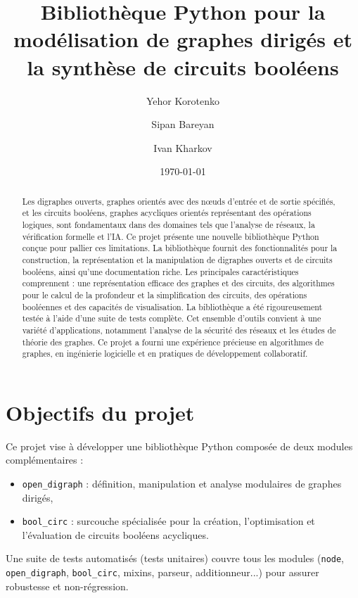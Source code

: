 \documentclass[a4paper,12pt]{article}
\title{Bibliothèque Python pour la modélisation de graphes dirigés et la synthèse de circuits booléens}
\author{Yehor Korotenko \and Sipan Bareyan \and Ivan Kharkov}
\date{\today}
\begin{document}
\maketitle
\begin{abstract}
    Les digraphes ouverts, graphes orientés avec des nœuds d'entrée et de
    sortie spécifiés, et les circuits booléens, graphes acycliques orientés
    représentant des opérations logiques, sont fondamentaux dans des domaines
    tels que l'analyse de réseaux, la vérification formelle et l'IA. Ce projet
    présente une nouvelle bibliothèque Python conçue pour pallier ces
    limitations. La bibliothèque fournit des fonctionnalités pour la
    construction, la représentation et la manipulation de digraphes ouverts et
    de circuits booléens, ainsi qu'une documentation riche. Les principales
    caractéristiques comprennent : une représentation efficace des graphes et
    des circuits, des algorithmes pour le calcul de la profondeur et la
    simplification des circuits, des opérations booléennes et des capacités de
    visualisation. La bibliothèque a été rigoureusement testée à l'aide d'une
    suite de tests complète. Cet ensemble d'outils convient à une variété
    d'applications, notamment l'analyse de la sécurité des réseaux et les
    études de théorie des graphes. Ce projet a fourni une expérience précieuse
    en algorithmes de graphes, en ingénierie logicielle et en pratiques de
    développement collaboratif.
\end{abstract}

\section{Objectifs du projet}
Ce projet vise à développer une bibliothèque Python composée de deux modules complémentaires :
\begin{itemize}
  \item \texttt{open\_digraph} : définition, manipulation et analyse modulaires de graphes dirigés,
  \item \texttt{bool\_circ} : surcouche spécialisée pour la création, l'optimisation et l'évaluation de circuits booléens acycliques.
\end{itemize}
Une suite de tests automatisés (tests unitaires) couvre tous les modules (\texttt{node}, \texttt{open\_digraph}, \texttt{bool\_circ}, mixins, parseur, additionneur...) pour assurer robustesse et non-régression.
\end{document}
